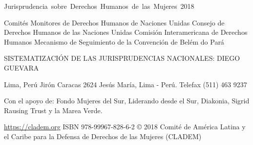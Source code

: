 \newpage
\thispagestyle{empty}

\begin{flushleft}\hbox{\Large{Jurisprudencia sobre Derechos Humanos de las Mujeres 2018}}

Comités Monitores de Derechos Humanos de Naciones Unidas
Consejo de Derechos Humanos de las Naciones Unidas
Comisión Interamericana de Derechos Humanos
Mecanismo de Seguimiento de la Convención de Belém do Pará

SISTEMATIZACIÓN DE LAS JURISPRUDENCIAS NACIONALES: DIEGO GUEVARA

Lima, Perú
Jirón Caracas 2624 Jesús María, Lima - Perú. Telefax (511) 463 9237

Con el apoyo de: Fondo Mujeres del Sur, Liderando desde el Sur, Diakonia, Sigrid Rausing Trust y la Marea Verde.

\vfill
\url{https://cladem.org}
ISBN 978-99967-828-6-2
© 2018 Comité de América Latina y el Caribe para la Defensa de Derechos de las Mujeres (CLADEM)

\end{flushleft}
\newpage

